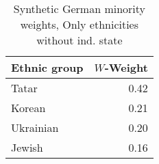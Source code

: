 \begin{table}[t]

\caption{\label{tab:sc_weights_without_ind_state}Synthetic German minority weights, Only ethnicities without ind. state}
\centering
\begin{tabular}{lr}
\toprule
Ethnic group & $W$-Weight\\
\midrule
Tatar & 0.42\\
Korean & 0.21\\
Ukrainian & 0.20\\
Jewish & 0.16\\
\bottomrule
\end{tabular}
\end{table}